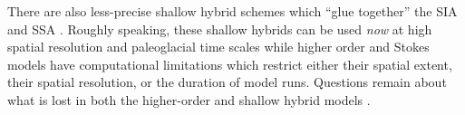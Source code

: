 \documentclass[titlepage,letterpaper,final,12pt]{scrartcl}
\begin{document}
There are also less-precise shallow hybrid schemes which ``glue together'' the SIA and SSA \cite{PollardDeConto,BBssasliding,Goldberg2011}.  Roughly speaking, these shallow hybrids can be used \emph{now} at high spatial resolution and paleoglacial time scales while higher order and Stokes models have computational limitations which restrict either their spatial extent, their spatial resolution, or the duration of model runs.  Questions remain about what is lost in both the higher-order and shallow hybrid models \cite[for example]{ISMIPHOM}.





\end{document}
